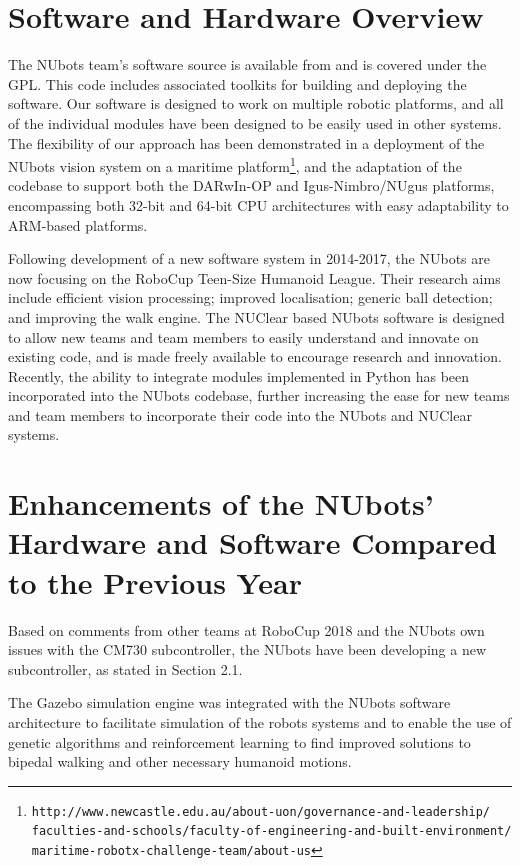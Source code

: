 \documentclass{llncs}
\begin{document}
\section{Software and Hardware Overview}
The NUbots team's software source is available from \cite{nubotsGit} and is covered under the GPL. This code includes associated toolkits for building and deploying the software. Our software is designed to work on multiple robotic platforms, and all of the individual modules have been designed to be easily used in other systems. The flexibility of our approach has been demonstrated in a deployment of the NUbots vision system on a maritime platform\footnote{\texttt{http://www.newcastle.edu.au/about-uon/governance-and-leadership/ faculties-and-schools/faculty-of-engineering-and-built-environment/ maritime-robotx-challenge-team/about-us}}, and the adaptation of the codebase to support both the DARwIn-OP and Igus-Nimbro/NUgus platforms, encompassing both 32-bit and 64-bit CPU architectures with easy adaptability to ARM-based platforms.

Following development of a new software system in 2014-2017, the NUbots are now focusing on the RoboCup Teen-Size Humanoid League. Their research aims include efficient vision processing; improved localisation; generic ball detection; and improving the walk engine. The NUClear based NUbots software is designed to allow new teams and team members to easily understand and innovate on existing code, and is made freely available to encourage research and innovation. Recently, the ability to integrate modules implemented in Python has been incorporated into the NUbots codebase, further increasing the ease for new teams and team members to incorporate their code into the NUbots and NUClear systems.

\section{Enhancements of the NUbots’ Hardware and Software Compared to the Previous Year}
Based on comments from other teams at RoboCup 2018 and the NUbots own issues with the CM730 subcontroller, the NUbots have been developing a new subcontroller, as stated in Section 2.1.

The Gazebo simulation engine was integrated with the NUbots software architecture to facilitate simulation of the robots systems and to enable the use of genetic algorithms and reinforcement learning to find improved solutions to bipedal walking and other necessary humanoid motions.
\end{document}
